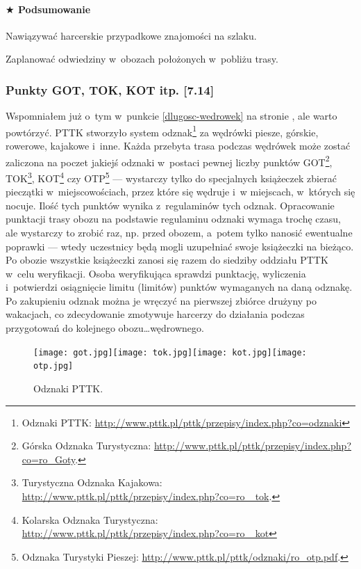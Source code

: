 \documentclass[a5paper,10pt,titlepage,twoside]{article}
\newcommand*{\thecheckbox}{\hss$\Box$} %
\newenvironment*{checklist}
{\list{}{%
\renewcommand*{\makelabel}[1]{\thecheckbox}}}
{\endlist}
\begin{document}
\paragraph{$\bigstar$ Podsumowanie}
\begin{checklist}
\item Nawiązywać harcerskie przypadkowe znajomości na szlaku.
\item Zaplanować odwiedziny w~obozach położonych w~pobliżu trasy.
\end{checklist}

\subsubsection{Punkty GOT, TOK, KOT itp. [7.14]\label{odznaki-pttk}}
Wspomniałem już o~tym w~punkcie \ref{dlugosc-wedrowek} na stronie \pageref{dlugosc-wedrowek}, ale warto powtórzyć. PTTK stworzyło system odznak\footnote{Odznaki PTTK: \href{http://www.pttk.pl/pttk/przepisy/index.php?co=odznaki}{http://www.pttk.pl/pttk/przepisy/index.php?co=odznaki}} za wędrówki piesze, górskie, rowerowe, kajakowe i~inne. Każda przebyta trasa podczas wędrówek może zostać zaliczona na poczet jakiejś odznaki w~postaci pewnej liczby punktów GOT\footnote{Górska Odznaka Turystyczna: \href{http://www.pttk.pl/pttk/przepisy/index.php?co=ro_got}{http://www.pttk.pl/pttk/przepisy/index.php?co=ro\_Goty}.}, TOK\footnote{Turystyczna Odznaka Kajakowa: \href{http://www.pttk.pl/pttk/przepisy/index.php?co=ro_tok}{http://www.pttk.pl/pttk/przepisy/index.php?co=ro\_ tok}.}, KOT\footnote{Kolarska Odznaka Turystyczna: \href{http://www.pttk.pl/pttk/przepisy/index.php?co=ro_kot}{http://www.pttk.pl/pttk/przepisy/index.php?co=ro\_ kot}} czy OTP\footnote{Odznaka Turystyki Pieszej: \href{http://www.pttk.pl/pttk/odznaki/ro\_itp.pif}{http://www.pttk.pl/pttk/odznaki/ro\_otp.pdf}.} --- wystarczy tylko do specjalnych książeczek zbierać pieczątki w~miejscowościach, przez które się wędruje i~w miejscach, w~których się nocuje. Ilość tych punktów wynika z~regulaminów tych odznak. Opracowanie punktacji trasy obozu na podstawie regulaminu odznaki wymaga trochę czasu, ale wystarczy to zrobić raz, np. przed obozem, a~potem tylko nanosić ewentualne poprawki --- wtedy uczestnicy będą mogli uzupełniać swoje książeczki na bieżąco. Po obozie wszystkie książeczki zanosi się razem do siedziby oddziału PTTK w~celu weryfikacji. Osoba weryfikująca sprawdzi punktację, wyliczenia i~potwierdzi osiągnięcie limitu (limitów) punktów wymaganych na daną odznakę. Po zakupieniu odznak można je wręczyć na pierwszej zbiórce drużyny po wakacjach, co zdecydowanie zmotywuje harcerzy do działania podczas przygotowań do kolejnego obozu\ldots wędrownego.
\begin{figure}[htp]
\centering
\texttt{[image: got.jpg]}\texttt{[image: tok.jpg]}\texttt{[image: kot.jpg]}\texttt{[image: otp.jpg]}
\caption[Caption for LOF]{Odznaki PTTK.\footnotemark}
\label{fig:odznaki}
\end{figure}
\end{document}
